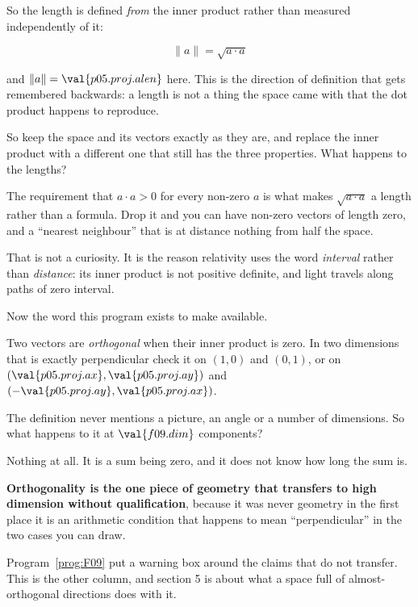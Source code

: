 \begin{fr}
So the length is defined \emph{from} the inner product rather than measured
independently of it:

\[ \lVert a \rVert = \sqrt{a \cdot a} \]

and $\lVert a \rVert = \val{p05.proj.alen}$ here. This is the direction of
definition that gets remembered backwards: a length is not a thing the space
came with that the dot product happens to reproduce.

So keep the space and its vectors exactly as they are, and replace the inner
product with a different one that still has the three properties. What happens
to the lengths?
\dotline
\nextframe
\end{fr}

\begin{fr}
\begin{note}
The requirement that $a \cdot a > 0$ for every non-zero $a$ is what makes
$\sqrt{a \cdot a}$ a length rather than a formula. Drop it and you can have
non-zero vectors of length zero, and a \enquote{nearest neighbour} that is at
distance nothing from half the space.

That is not a curiosity. It is the reason relativity uses the word
\emph{interval} rather than \emph{distance}: its inner product is not positive
definite, and light travels along paths of zero interval.
\end{note}
\end{fr}

\begin{fr}
Now the word this program exists to make available.

Two vectors are \emph{orthogonal} when their inner product is zero. In two
dimensions that is exactly perpendicular \dash{} check it on $(1, 0)$ and
$(0, 1)$, or on $(\val{p05.proj.ax}, \val{p05.proj.ay})$ and
$(-\val{p05.proj.ay}, \val{p05.proj.ax})$.

The definition never mentions a picture, an angle or a number of dimensions.
So what happens to it at $\val{f09.dim}$ components?
\nextframe
\end{fr}

\begin{fr}
\begin{ansblock}
Nothing at all. It is a sum being zero, and it does not know how long the sum
is.
\end{ansblock}

\textbf{Orthogonality is the one piece of geometry that transfers to high
dimension without qualification}, because it was never geometry in the first
place \dash{} it is an arithmetic condition that happens to mean
\enquote{perpendicular} in the two cases you can draw.

Program~\ref{prog:F09} put a warning box around the claims that do not
transfer. This is the other column, and section 5 is about what a space full of
almost-orthogonal directions does with it.
\end{fr}

